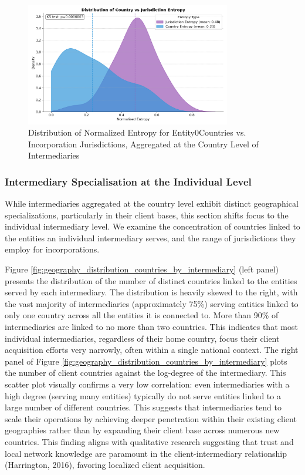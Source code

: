 \begin{figure}[htbp]
    \centering
    \includegraphics[width=0.8\textwidth]{images/Geography_Country_Level_Entropy_Distribution.png}
    \caption{Distribution of Normalized Entropy for Entity0Countries vs. Incorporation Jurisdictions, Aggregated at the Country Level of Intermediaries}
    \label{fig:geography_country_level_entropy_distribution}
\end{figure}

\subsubsection{Intermediary Specialisation at the Individual Level}
\label{subsubsec:network_countries_served} 

While intermediaries aggregated at the country level exhibit distinct geographical specializations, particularly in their client bases, this section shifts focus to the individual intermediary level. We examine the concentration of countries linked to the entities an individual intermediary serves, and the range of jurisdictions they employ for incorporations.

Figure \ref{fig:geography_distribution_countries_by_intermediary} (left panel) presents the distribution of the number of distinct countries linked to the entities served by each intermediary. The distribution is heavily skewed to the right, with the vast majority of intermediaries (approximately 75\%) serving entities linked to only one country across all the entities it is connected to. More than 90\% of intermediaries are linked to no more than two countries. This indicates that most individual intermediaries, regardless of their home country, focus their client acquisition efforts very narrowly, often within a single national context. The right panel of Figure \ref{fig:geography_distribution_countries_by_intermediary} plots the number of client countries against the log-degree of the intermediary. This scatter plot visually confirms a very low correlation: even intermediaries with a high degree (serving many entities) typically do not serve entities linked to a large number of different countries. This suggests that intermediaries tend to scale their operations by achieving deeper penetration within their existing client geographies rather than by expanding their client base across numerous new countries. This finding aligns with qualitative research suggesting that trust and local network knowledge are paramount in the client-intermediary relationship (Harrington, 2016), favoring localized client acquisition.


